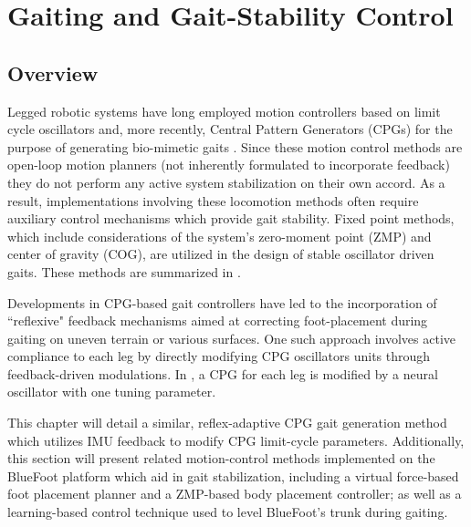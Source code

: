 
\chapter{Gaiting and Gait-Stability Control}
	\label{ch::gait_control}
	

	\section{Overview}

		Legged robotic systems have long employed motion controllers based on limit cycle oscillators and, more recently, Central Pattern Generators (CPGs)  for the purpose of generating bio-mimetic gaits \cite{Matsuoka1985,Collins1993,Endo2004,Righetti2006,Ijspeert2008,Matos2010,Ajallooeian2013,Park2014,Fukuoka2015}. Since these motion control methods are open-loop motion planners (\IE not inherently formulated to incorporate feedback) they do not perform any active system stabilization on their own accord. As a result, implementations involving these  locomotion methods often require auxiliary control mechanisms which provide gait stability. Fixed point methods, which include considerations of the system's zero-moment point (ZMP) and center of gravity (COG), are utilized in the design of stable oscillator driven gaits. These methods are summarized in \cite{Wieber2015}. %

		Developments in CPG-based gait controllers have led to the incorporation of ``reflexive" feedback mechanisms aimed at correcting foot-placement during gaiting on uneven terrain or various surfaces. One such approach involves active compliance to each leg by directly modifying CPG oscillators units through feedback-driven modulations. In \cite{Fukuoka2003,Endo2004}, a CPG for each leg is modified by a neural oscillator with one tuning parameter. 

		This chapter will detail a similar, reflex-adaptive CPG gait generation method which utilizes IMU feedback to modify CPG limit-cycle parameters. Additionally, this section will present related motion-control methods implemented on the BlueFoot platform which aid in gait stabilization, including a virtual force-based foot placement planner and a ZMP-based body placement controller; as well as a learning-based control technique used to level BlueFoot's trunk during gaiting.



